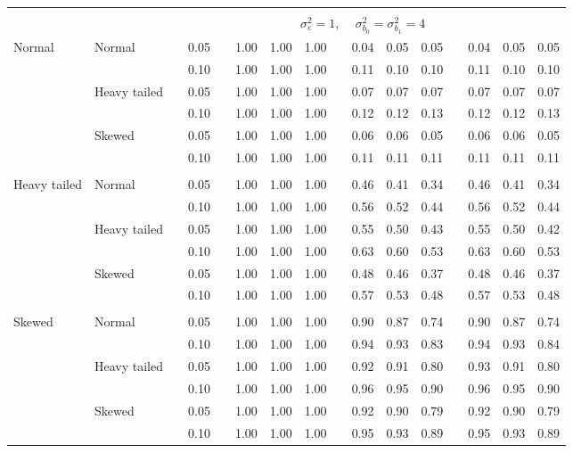 \begin{table}[ht]
\begin{scriptsize}
\begin{tabular}{ll p{.1cm} c p{.1cm} rrr p{.1cm} rrr p{.1cm} rrr}
&&&&&&&&&&&&&&&\\
& && && \multicolumn{9}{c}{$\sigma_{\varepsilon}^2 = 1$, \ \ $\sigma_{b_0}^2 = \sigma_{b_1}^2 = 4$} \\ \cline{6-16}

\rowcolor{gray!20} Normal       & Normal       && 0.05 &&  1.00 & 1.00 & 1.00 && 0.04 & 0.05 & 0.05 && 0.04 & 0.05 & 0.05 \\ 
\rowcolor{gray!20}             &              && 0.10 &&  1.00 & 1.00 & 1.00 && 0.11 & 0.10 & 0.10 && 0.11 & 0.10 & 0.10 \\ 
\rowcolor{gray!20}             & Heavy tailed && 0.05 &&  1.00 & 1.00 & 1.00 && 0.07 & 0.07 & 0.07 && 0.07 & 0.07 & 0.07 \\ 
\rowcolor{gray!20}             &              && 0.10 &&  1.00 & 1.00 & 1.00 && 0.12 & 0.12 & 0.13 && 0.12 & 0.12 & 0.13 \\ 
\rowcolor{gray!20}             & Skewed       && 0.05 &&  1.00 & 1.00 & 1.00 && 0.06 & 0.06 & 0.05 && 0.06 & 0.06 & 0.05 \\ 
\rowcolor{gray!20}             &              && 0.10 &&  1.00 & 1.00 & 1.00 && 0.11 & 0.11 & 0.11 && 0.11 & 0.11 & 0.11 \\ 
             &&&&&&&&&&&&&&&\\
Heavy tailed & Normal       && 0.05 &&  1.00 & 1.00 & 1.00 && 0.46 & 0.41 & 0.34 && 0.46 & 0.41 & 0.34 \\ 
             &              && 0.10 &&  1.00 & 1.00 & 1.00 && 0.56 & 0.52 & 0.44 && 0.56 & 0.52 & 0.44 \\ 
             & Heavy tailed && 0.05 &&  1.00 & 1.00 & 1.00 && 0.55 & 0.50 & 0.43 && 0.55 & 0.50 & 0.42 \\ 
             &              && 0.10 &&  1.00 & 1.00 & 1.00 && 0.63 & 0.60 & 0.53 && 0.63 & 0.60 & 0.53 \\ 
             & Skewed       && 0.05 &&  1.00 & 1.00 & 1.00 && 0.48 & 0.46 & 0.37 && 0.48 & 0.46 & 0.37 \\ 
             &              && 0.10 &&  1.00 & 1.00 & 1.00 && 0.57 & 0.53 & 0.48 && 0.57 & 0.53 & 0.48 \\ 
             &&&&&&&&&&&&&&&\\
Skewed       & Normal       && 0.05 &&  1.00 & 1.00 & 1.00 && 0.90 & 0.87 & 0.74 && 0.90 & 0.87 & 0.74 \\ 
             &              && 0.10 &&  1.00 & 1.00 & 1.00 && 0.94 & 0.93 & 0.83 && 0.94 & 0.93 & 0.84 \\ 
             & Heavy tailed && 0.05 &&  1.00 & 1.00 & 1.00 && 0.92 & 0.91 & 0.80 && 0.93 & 0.91 & 0.80 \\ 
             &              && 0.10 &&  1.00 & 1.00 & 1.00 && 0.96 & 0.95 & 0.90 && 0.96 & 0.95 & 0.90 \\ 
             & Skewed       && 0.05 &&  1.00 & 1.00 & 1.00 && 0.92 & 0.90 & 0.79 && 0.92 & 0.90 & 0.79 \\ 
             &              && 0.10 &&  1.00 & 1.00 & 1.00 && 0.95 & 0.93 & 0.89 && 0.95 & 0.93 & 0.89 \\ 


\end{tabular}
\end{scriptsize}
\end{table}

